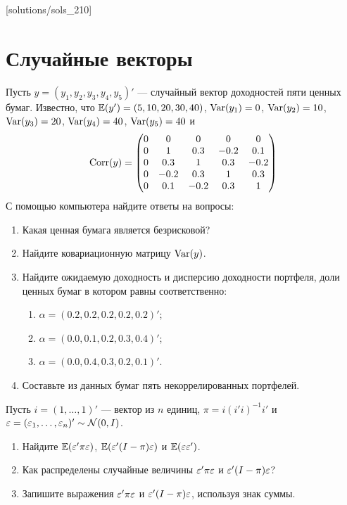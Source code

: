 [solutions/sols_210]

\chapter{Случайные векторы}


\begin{problem}
Пусть $y=(y_1, y_2, y_3, y_4, y_5)'$ — случайный вектор доходностей пяти ценных бумаг. Известно, что $\mathbb{E}(y')=(5, 10, 20, 30, 40)$, $\operatorname{Var}(y_1)=0$, $\operatorname{Var}(y_2)=10$, $\operatorname{Var}(y_3)=20$, $\operatorname{Var}(y_4)=40$, $\operatorname{Var}(y_5)=40$ и
\[
\operatorname{Corr}(y)=\begin{pmatrix}
0 & 0 & 0 & 0 & 0 \\
0 & 1 & 0.3 & -0.2 & 0.1 \\
0 & 0.3 & 1 & 0.3 & -0.2 \\
0 & -0.2 & 0.3& 1 & 0.3 \\
0 & 0.1 & -0.2 & 0.3 & 1
\end{pmatrix}
\]
С помощью компьютера найдите ответы на вопросы:
\begin{enumerate}
\item Какая ценная бумага является безрисковой?
\item Найдите ковариационную матрицу $\operatorname{Var}(y)$.
\item Найдите ожидаемую доходность и дисперсию доходности портфеля, доли ценных бумаг в котором равны соответственно:
\begin{enumerate}
\item $\alpha=(0.2, 0.2, 0.2, 0.2, 0.2)'$;
\item $\alpha=(0.0, 0.1, 0.2, 0.3, 0.4)'$;
\item $\alpha=(0.0, 0.4, 0.3, 0.2, 0.1)'$.
\end{enumerate}
\item Составьте из данных бумаг пять некоррелированных портфелей.
\end{enumerate}


\begin{sol}
\newpage
\end{sol}
\end{problem}



\begin{problem}
Пусть $i = (1,\dots,1)'$ — вектор из $n$ единиц, $\pi=i(i'i)^{-1}i'$ и $\varepsilon = (\varepsilon_1,\dots,\varepsilon_n)'\sim \mathcal{N}(0,I)$.
\begin{enumerate}
\item Найдите $\mathbb{E}(\varepsilon'\pi\varepsilon)$, $\mathbb{E}(\varepsilon'(I-\pi)\varepsilon)$ и $\mathbb{E}(\varepsilon\varepsilon')$.
\item Как распределены случайные величины $\varepsilon'\pi\varepsilon$ и $\varepsilon'(I-\pi)\varepsilon$?
\item Запишите выражения $\varepsilon'\pi\varepsilon$ и $\varepsilon'(I-\pi)\varepsilon$, используя знак суммы.
\end{enumerate}


\begin{sol}
\end{sol}
\end{problem}




